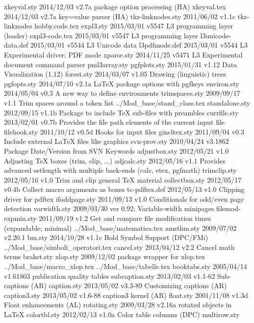  xkeyval.sty    2014/12/03 v2.7a package option processing (HA)
 xkeyval.tex    2014/12/03 v2.7a key=value parser (HA)
tkz-linknodes.sty    2011/06/02 v1.1c tkz-linknodes
   hobby.code.tex
   expl3.sty    2015/03/01 v5547 L3 programming layer (loader) 
expl3-code.tex    2015/03/01 v5547 L3 programming layer 
l3unicode-data.def    2015/03/01 v5544 L3 Unicode data
l3pdfmode.def    2015/03/01 v5544 L3 Experimental driver: PDF mode
  xparse.sty    2014/11/25 v5471 L3 Experimental document command parser
pml3array.sty    
pgfplots.sty    2015/01/31 v1.12 Data Visualization (1.12)
  forest.sty    2014/03/07 v1.05 Drawing (linguistic) trees
 pgfopts.sty    2014/07/10 v2.1a LaTeX package options with pgfkeys
 environ.sty    2014/05/04 v0.3 A new way to define environments
trimspaces.sty    2009/09/17 v1.1 Trim spaces around a token list
../Mod_base/stand_class.tex
standalone.sty    2012/09/15 v1.1b Package to include TeX sub-files with preambles
currfile.sty    2013/02/01 v0.7b Provides the file path elements of the current input file
filehook.sty    2011/10/12 v0.5d Hooks for input files
gincltex.sty    2011/09/04 v0.3 Include external LaTeX files like graphics
svn-prov.sty    2010/04/24 v3.1862 Package Date/Version from SVN Keywords
adjustbox.sty    2012/05/21 v1.0 Adjusting TeX boxes (trim, clip, ...)
 adjcalc.sty    2012/05/16 v1.1 Provides advanced setlength with multiple back-ends (calc, etex, pgfmath)
trimclip.sty    2012/05/16 v1.0 Trim and clip general TeX material
collectbox.sty    2012/05/17 v0.4b Collect macro arguments as boxes
tc-pdftex.def    2012/05/13 v1.0 Clipping driver for pdftex
ifoddpage.sty    2011/09/13 v1.0 Conditionals for odd/even page detection
varwidth.sty    2009/03/30 ver 0.92;  Variable-width minipages
filemod-expmin.sty    2011/09/19 v1.2 Get and compare file modification times (expandable; minimal)
../Mod_base/matematica.tex
  amsthm.sty    2009/07/02 v2.20.1
      bm.sty    2014/10/28 v1.1c Bold Symbol Support (DPC/FMi)
../Mod_base/simboli_operatori.tex
  cancel.sty    2013/04/12 v2.2 Cancel math terms
  braket.sty    
    xlop.sty    2009/12/02 package wrapper for xlop.tex
../Mod_base/macro_xlop.tex
../Mod_base/tabelle.tex
booktabs.sty    2005/04/14 v1.61803 publication quality tables
subcaption.sty    2013/02/03 v1.1-62 Sub-captions (AR)
 caption.sty    2013/05/02 v3.3-89 Customizing captions (AR)
caption3.sty    2013/05/02 v1.6-88 caption3 kernel (AR)
   float.sty    2001/11/08 v1.3d Float enhancements (AL)
rotating.sty    2009/03/28 v2.16a rotated objects in LaTeX
colortbl.sty    2012/02/13 v1.0a Color table columns (DPC)
multirow.sty    
